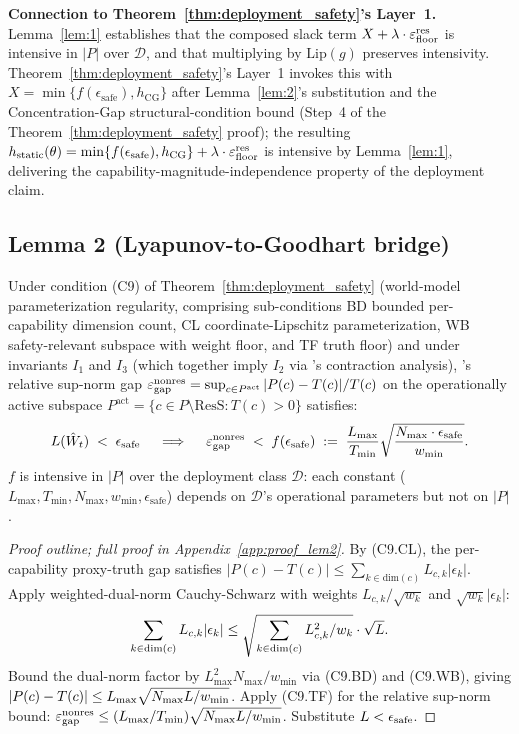 \textbf{Connection to Theorem~\ref{thm:deployment_safety}'s Layer~1.}
Lemma~\ref{lem:1} establishes that the composed slack term
$X + \lambda \cdot \varepsilon_{\mathrm{floor}}^{\mathrm{res}}$ is intensive in $|P|$ over
$\mathcal{D}$, and that multiplying by $\mathrm{Lip}(g)$ preserves
intensivity.  Theorem~\ref{thm:deployment_safety}'s Layer~1 invokes
this with $X = \min\{f(\epsilon_{\mathrm{safe}}), h_{\mathrm{CG}}\}$
after Lemma~\ref{lem:2}'s substitution and the
Concentration-Gap structural-condition bound (Step~4 of the
Theorem~\ref{thm:deployment_safety} proof); the resulting
$h_{\mathrm{static}}(\theta) = \min\{f(\epsilon_{\mathrm{safe}}),
h_{\mathrm{CG}}\} + \lambda \cdot \varepsilon_{\mathrm{floor}}^{\mathrm{res}}$ is intensive by
Lemma~\ref{lem:1}, delivering the capability-magnitude-independence
property of the deployment claim.

\subsection{Lemma 2 (Lyapunov-to-Goodhart bridge)}
\label{sec:lem2}

\begin{lemma}
\label{lem:2}
Under condition (C9) of Theorem~\ref{thm:deployment_safety}
(world-model parameterization regularity, comprising sub-conditions
BD bounded per-capability dimension count, CL coordinate-Lipschitz
parameterization, WB safety-relevant subspace with weight floor,
and TF truth floor) and under invariants $I_1$ and $I_3$ (which
together imply $I_2$ via
\citep[Phase~Redundancy]{lasser2026phase}'s contraction analysis),
\citep[Microfoundation]{lasser2026micro}'s relative sup-norm gap
$\varepsilon_{\mathrm{gap}}^{\mathrm{nonres}} = \sup_{c \in P^{\mathrm{act}}} |P(c) - T(c)|/T(c)$ on
the operationally active subspace $P^{\mathrm{act}} = \{c \in P
\setminus \mathrm{ResS} : T(c) > 0\}$ satisfies:
\[
  L(\hat{W}_t) \;<\; \epsilon_{\mathrm{safe}}
  \quad\implies\quad
  \varepsilon_{\mathrm{gap}}^{\mathrm{nonres}} \;<\; f(\epsilon_{\mathrm{safe}})
  \;:=\; \frac{L_{\max}}{T_{\min}}
  \sqrt{\frac{N_{\max} \cdot \epsilon_{\mathrm{safe}}}{w_{\min}}}.
\]
$f$ is intensive in $|P|$ over the deployment class $\mathcal{D}$:
each constant ($L_{\max}, T_{\min}, N_{\max}, w_{\min},
\epsilon_{\mathrm{safe}}$) depends on $\mathcal{D}$'s operational
parameters but not on $|P|$.
\end{lemma}

\begin{proof}[Proof outline; full proof in
Appendix~\ref{app:proof_lem2}]
By (C9.CL), the per-capability proxy-truth gap satisfies $|P(c) -
T(c)| \leq \sum_{k \in \mathrm{dim}(c)} L_{c,k} |\epsilon_k|$.
Apply weighted-dual-norm Cauchy-Schwarz with weights
$L_{c,k}/\sqrt{w_k}$ and $\sqrt{w_k} |\epsilon_k|$:
\[
  \sum_{k \in \mathrm{dim}(c)} L_{c,k} |\epsilon_k|
  \leq \sqrt{\sum_{k \in \mathrm{dim}(c)} L_{c,k}^2/w_k} \cdot
  \sqrt{L}.
\]
Bound the dual-norm factor by $L_{\max}^2 N_{\max}/w_{\min}$ via
(C9.BD) and (C9.WB), giving $|P(c) - T(c)| \leq L_{\max}
\sqrt{N_{\max} L / w_{\min}}$.  Apply (C9.TF) for the relative
sup-norm bound: $\varepsilon_{\mathrm{gap}}^{\mathrm{nonres}} \leq (L_{\max}/T_{\min}) \sqrt{N_{\max}
L/w_{\min}}$.  Substitute $L < \epsilon_{\mathrm{safe}}$.
\end{proof}

